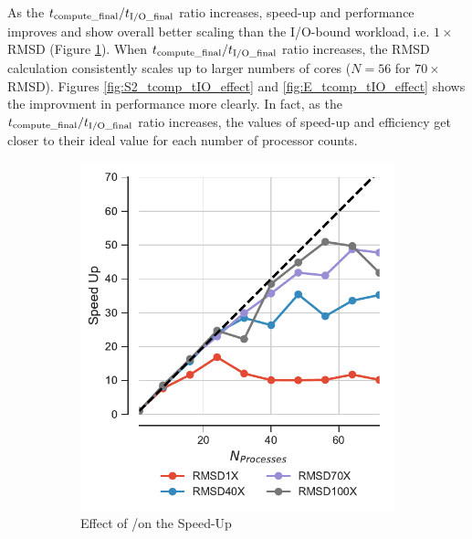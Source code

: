 As the ${t}_{\text{compute\_final}}/{t}_{\text{I/O\_final}}$ ratio increases, speed-up and performance improves and 
show overall better scaling than the I/O-bound workload, i.e. $1\times$ RMSD (Figure \ref{fig:S1_tcomp_tIO_effect}).
When ${t}_{\text{compute\_final}}/{t}_{\text{I/O\_final}}$ ratio increases, the RMSD calculation consistently scales up to larger numbers of cores ($N=56$ for $70\times$ RMSD).
Figures \ref{fig:S2_tcomp_tIO_effect} and \ref{fig:E_tcomp_tIO_effect} shows the improvment in performance more clearly.
In fact, as the ${t}_{\text{compute\_final}}/{t}_{\text{I/O\_final}}$ ratio increases, the values of speed-up and efficiency get closer to their ideal value for each number of processor counts.  

\begin{figure}
\centering
\begin{subfigure} {.3\textwidth}
  \includegraphics[width=\linewidth]{figures/Compute_to_IO_ratio_on_performance_2d_v17.pdf}
  \caption{Effect of \tcomp/\tIO on the Speed-Up}
  \label{fig:S1_tcomp_tIO_effect}
\end{subfigure}
\hfill
\begin{subfigure}{.3\textwidth}

\end{subfigure}
\end{figure}
